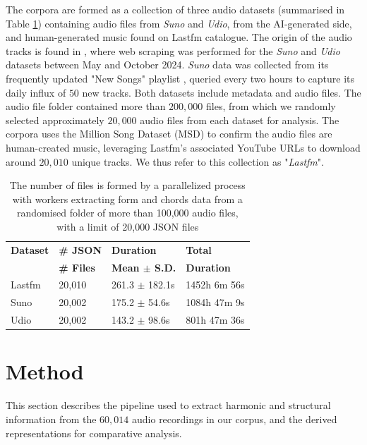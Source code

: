 \documentclass{article}
\begin{document}
The corpora are formed as a collection of three audio datasets (summarised in Table \ref{tab:datasets}) containing audio files from \textit{Suno} and \textit{Udio}, from the AI-generated side, and human-generated music found on Lastfm catalogue. The origin of the audio tracks is found in \citep{cros2025ai}, where web scraping was performed for the \textit{Suno} and \textit{Udio} datasets between May and October 2024. \textit{Suno} data was collected from its frequently updated "New Songs" playlist , queried every two hours to capture its daily influx of $50$ new tracks. Both datasets include metadata and audio files. The audio file folder contained more than $200,000$ files, from which we randomly selected approximately $20,000$ audio files from each dataset for analysis. The corpora uses the Million Song Dataset (MSD) \citep{Bertin-Mahieux2011} to confirm the audio files are human-created music, leveraging Lastfm's associated YouTube URLs to download around $20,010$ unique tracks. We thus refer to this collection as "\textit{Lastfm}". 


\begin{table}[htpb]
\centering
\begin{tabular}{llll}
\toprule
\textbf{Dataset} & \textbf{\# JSON} & \textbf{Duration} & \textbf{Total} \\
& \textbf{\# Files} & \textbf{Mean $\pm$ S.D.} & \textbf{Duration} \\
\midrule
    Lastfm & 20,010 & 261.3 $\pm$ 182.1s & 1452h 6m 56s \\
    Suno & 20,002 & 175.2 $\pm$ 54.6s & 1084h 47m 9s \\
    Udio & 20,002 & 143.2 $\pm$ 98.6s & 801h 47m 36s \\
\bottomrule
\end{tabular}
\caption{The number of files is formed by a parallelized process with workers extracting form and chords data from a randomised folder of more than 100,000 audio files, with a limit of 20,000 JSON files}
\label{tab:datasets}
\end{table}

\section{Method}
\label{sec:method}
This section describes the pipeline used to extract harmonic and structural information from the $60,014$ audio recordings in our corpus, and the derived representations for comparative analysis.
\end{document}
